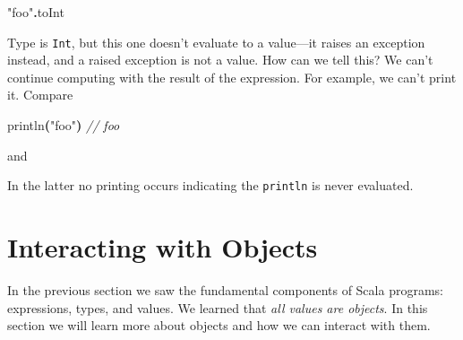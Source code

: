 \documentclass[11pt,a5paper,]{book}
\newenvironment{Shaded}{\begin{snugshade}}{\end{snugshade}}
\newcommand{\CommentTok}[1]{\textcolor[rgb]{0.56,0.35,0.01}{\textit{#1}}}
\newcommand{\FunctionTok}[1]{\textcolor[rgb]{0.00,0.00,0.00}{#1}}
\newcommand{\NormalTok}[1]{#1}
\newcommand{\OperatorTok}[1]{\textcolor[rgb]{0.81,0.36,0.00}{\textbf{#1}}}
\newcommand{\StringTok}[1]{\textcolor[rgb]{0.31,0.60,0.02}{#1}}
\begin{document}
\begin{Shaded}
\begin{Highlighting}[]
\StringTok{"foo"}\OperatorTok{.}\NormalTok{toInt}
\end{Highlighting}
\end{Shaded}

Type is \texttt{Int}, but this one doesn't evaluate to a value---it
raises an exception instead, and a raised exception is not a value. How
can we tell this? We can't continue computing with the result of the
expression. For example, we can't print it. Compare

\begin{Shaded}
\begin{Highlighting}[]
\FunctionTok{println}\OperatorTok{(}\StringTok{"foo"}\OperatorTok{)}
\CommentTok{// foo}
\end{Highlighting}
\end{Shaded}

and

\begin{Shaded}
\end{Shaded}

In the latter no printing occurs indicating the \texttt{println} is
never evaluated.

\hypertarget{interacting-with-objects}{%
\section{Interacting with Objects}\label{interacting-with-objects}}

In the previous section we saw the fundamental components of Scala
programs: expressions, types, and values. We learned that \emph{all
values are objects}. In this section we will learn more about objects
and how we can interact with them.
\end{document}
